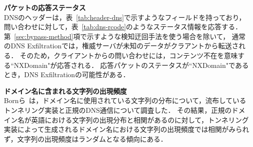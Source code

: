 %
%
\newpage
\hspace{-12pt}\textbf{パケットの応答ステータス}\\
\hspace{12pt}DNSのヘッダーは，表~\ref{tab:header-dns}で示すようなフィールドを持っており，問い合わせに対して，表~\ref{tab:dns-rcode}のようなステータス情報を応答する．
第~\ref{sec:bypass-method}項で示すような検知迂回手法を使う場合を除いて，
通常のDNS Exfiltrationでは，権威サーバが未知のデータがクラアントから転送される．
そのため，クライアントからの問い合わせには，コンテンツ不在を意味する``NXDomain"が応答される．
応答パケットのステータスが``NXDomain"であるとき，DNS Exfiltrationの可能性がある．



\hspace{-12pt}\textbf{ドメイン名に含まれる文字列の出現頻度}\\
\hspace{12pt}Bornら~\cite{born}は，ドメイン名に使用されている文字列の分布について，流布しているトンネリング実装と正規のDNS通信について調査した．
その結果，正規のドメイン名が英語における文字列の出現分布と相関があるのに対して，トンネリング実装によって生成されるドメイン名における文字列の出現頻度では相関がみられず，文字列の出現頻度はランダムとなる傾向にある．



